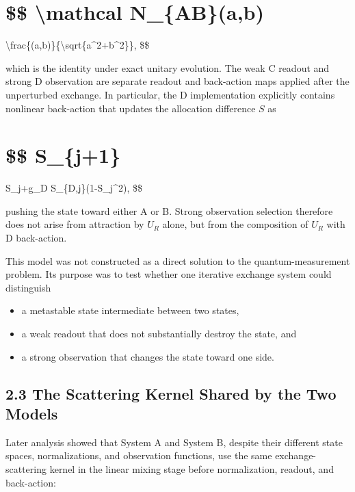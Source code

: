 \documentclass[
  a4paper,
  10pt]{article}
\providecommand{\tightlist}{%
  \setlength{\itemsep}{0pt}\setlength{\parskip}{0pt}}
\begin{document}
\section{\$\$ \textbackslash mathcal
N\_\{AB\}(a,b)}\label{-mathcal-n_abab}

\textbackslash frac\{(a,b)\}\{\textbackslash sqrt\{\textbar a\textbar\^{}2+\textbar b\textbar\^{}2\}\},
\$\$

which is the identity under exact unitary evolution. The weak C readout
and strong D observation are separate readout and back-action maps
applied after the unperturbed exchange. In particular, the D
implementation explicitly contains nonlinear back-action that updates
the allocation difference \(S\) as

\section{\$\$ S\_\{j+1\}}\label{-s_j1}

S\_j+g\_D S\_\{D,j\}(1-S\_j\^{}2), \$\$

pushing the state toward either A or B. Strong observation selection
therefore does not arise from attraction by \(U_R\) alone, but from the
composition of \(U_R\) with D back-action.

This model was not constructed as a direct solution to the
quantum-measurement problem. Its purpose was to test whether one
iterative exchange system could distinguish

\begin{itemize}
\tightlist
\item
  a metastable state intermediate between two states,
\item
  a weak readout that does not substantially destroy the state, and
\item
  a strong observation that changes the state toward one side.
\end{itemize}

\subsection{2.3 The Scattering Kernel Shared by the Two
Models}\label{23-the-scattering-kernel-shared-by-the-two-models}

Later analysis showed that System A and System B, despite their
different state spaces, normalizations, and observation functions, use
the same exchange-scattering kernel in the linear mixing stage before
normalization, readout, and back-action:
\end{document}
